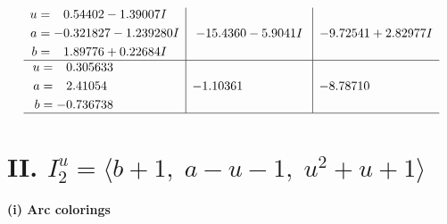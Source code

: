\documentclass[1p]{elsarticle_modified}
\theoremstyle{definition}
\begin{document}
$$\begin{array}{c|c|c}
\begin{aligned}
u &= \phantom{-}0.54402 - 1.39007 I \\
a &= -0.321827 - 1.239280 I \\
b &= \phantom{-}1.89776 + 0.22684 I\end{aligned}
 & -15.4360 - 5.9041 I & -9.72541 + 2.82977 I \\ \hline\begin{aligned}
u &= \phantom{-}0.305633\phantom{ +0.000000I} \\
a &= \phantom{-}2.41054\phantom{ +0.000000I} \\
b &= -0.736738\phantom{ +0.000000I}\end{aligned}
 & -1.10361\phantom{ +0.000000I} & -8.78710\phantom{ +0.000000I}\\
 \hline 
 \end{array}$$\newpage\newpage\renewcommand{\arraystretch}{1}
\centering \section*{II. $I^u_{2}= \langle b+1,\;a- u-1,\;u^2+u+1 \rangle$}
\flushleft \textbf{(i) Arc colorings}\\
\end{document}
